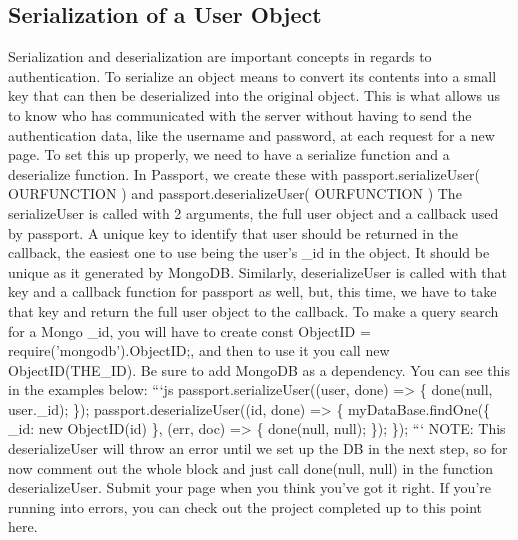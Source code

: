 \documentclass{article}%
\begin{document}
%
\subsection{Serialization of a User Object}%
\label{subsec:SerializationofaUserObject}%
Serialization and deserialization are important concepts in regards to authentication. To serialize an object means to convert its contents into a small key that can then be deserialized into the original object. This is what allows us to know who has communicated with the server without having to send the authentication data, like the username and password, at each request for a new page.\newline%
To set this up properly, we need to have a serialize function and a deserialize function. In Passport, we create these with passport.serializeUser( OURFUNCTION ) and passport.deserializeUser( OURFUNCTION )\newline%
The serializeUser is called with 2 arguments, the full user object and a callback used by passport. A unique key to identify that user should be returned in the callback, the easiest one to use being the user's \_id in the object. It should be unique as it generated by MongoDB. Similarly, deserializeUser is called with that key and a callback function for passport as well, but, this time, we have to take that key and return the full user object to the callback. To make a query search for a Mongo \_id, you will have to create const ObjectID = require('mongodb').ObjectID;, and then to use it you call new ObjectID(THE\_ID). Be sure to add MongoDB as a dependency. You can see this in the examples below:\newline%
```js\newline%
passport.serializeUser((user, done) => \{\newline%
  done(null, user.\_id);\newline%
\});\newline%
passport.deserializeUser((id, done) => \{\newline%
  myDataBase.findOne(\{ \_id: new ObjectID(id) \}, (err, doc) => \{\newline%
    done(null, null);\newline%
  \});\newline%
\});\newline%
```\newline%
NOTE: This deserializeUser will throw an error until we set up the DB in the next step, so for now comment out the whole block and just call done(null, null) in the function deserializeUser.\newline%
Submit your page when you think you've got it right. If you're running into errors, you can check out the project completed up to this point here.\newline%
\end{document}
